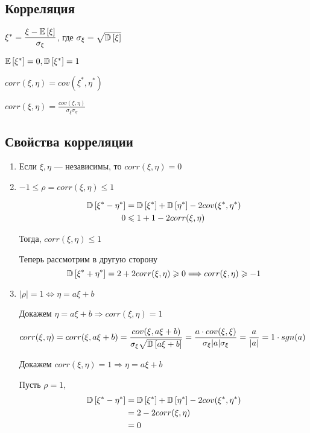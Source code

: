 \documentclass[a4paper, 10pt]{article}
\begin{document}
\subsection{Корреляция}
 $\xi^*=\displaystyle\frac{\xi-\mathbb{E}\left[\xi\right]}{\sigma_\xi}$, где $\sigma_\xi=\sqrt{\mathbb{D}\left[\xi\right]}$

\comment $\mathbb{E}\left[\xi^*\right]=0,\mathbb{D}\left[\xi^*\right]=1$

 $corr(\xi,\eta)=cov(\xi^*,\eta^*)$

 $corr(\xi,\eta)=\displaystyle\frac{cov(\xi,\eta)}{\sigma_\xi \sigma_\eta}$


\subsection{Свойства корреляции}
\begin{enumerate}
    \item Если $\xi,\eta$ — независимы, то $corr(\xi,\eta)=0$
    \item $-1\leqslant\rho=corr(\xi,\eta)\leqslant1$
    
    \proof $$\begin{aligned}
        \mathbb{D}\left[\xi^*-\eta^*\right]&=\mathbb{D}\left[\xi^*\right]+\mathbb{D}\left[\eta^*\right]-2cov(\xi^*,\eta^*)\\
        0&\leqslant 1+1-2corr(\xi,\eta)
    \end{aligned}$$

    Тогда, $corr(\xi,\eta)\leqslant1$

    Теперь рассмотрим в другую сторону
    \begin{equation*}
        \mathbb{D}\left[\xi^*+\eta^*\right]=2+2corr(\xi,\eta)\geqslant0\Longrightarrow corr(\xi,\eta)\geqslant-1
    \end{equation*}
    
    \item $|\rho|=1\Longleftrightarrow\eta=a\xi+b$
    
    \proof Докажем $\eta=a\xi+b\Longrightarrow corr(\xi,\eta)=1$

    $corr(\xi,\eta)=corr(\xi,a\xi+b)=\displaystyle\frac{cov(\xi,a\xi+b)}{\sigma_\xi\sqrt{\mathbb{D}\left[a\xi+b\right]}}=\frac{a\cdot cov(\xi,\xi)}{\sigma_\xi|a|\sigma_\xi}=\frac{a}{|a|}=1\cdot sgn(a)$

    Докажем $ corr(\xi,\eta)=1\Longrightarrow \eta=a\xi+b$

    Пусть $\rho=1$, $$\begin{aligned}
        \mathbb{D}\left[\xi^*-\eta^*\right]&=\mathbb{D}\left[\xi^*\right]+\mathbb{D}\left[\eta^*\right]-2cov(\xi^*,\eta^*)\\
        &=2-2corr(\xi,\eta)\\
        &=0
    \end{aligned}$$


\end{enumerate}
\end{document}
